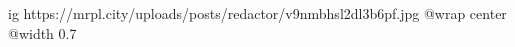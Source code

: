  
 
 
 
 

\ifcmt
  ig https://mrpl.city/uploads/posts/redactor/v9nmbhsl2dl3b6pf.jpg
  @wrap center
  @width 0.7
\fi
